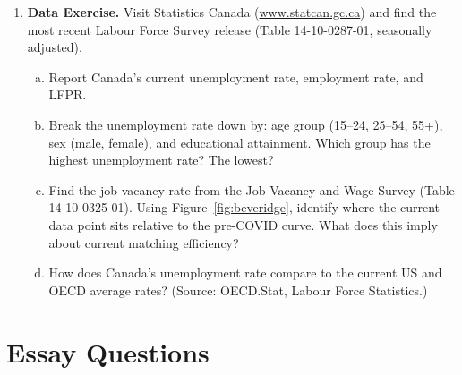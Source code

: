 \begin{enumerate}
\item \textbf{Data Exercise.}
Visit Statistics Canada (\url{www.statcan.gc.ca}) and find the most recent
Labour Force Survey release (Table 14-10-0287-01, seasonally adjusted).
\begin{enumerate}[(a)]
  \item Report Canada's current unemployment rate, employment rate, and LFPR.
  \item Break the unemployment rate down by: age group (15--24, 25--54,
        55+), sex (male, female), and educational attainment.
        Which group has the highest unemployment rate? The lowest?
  \item Find the job vacancy rate from the Job Vacancy and Wage Survey
        (Table 14-10-0325-01). Using Figure~\ref{fig:beveridge}, identify
        where the current data point sits relative to the pre-COVID curve.
        What does this imply about current matching efficiency?
  \item How does Canada's unemployment rate compare to the current US and
        OECD average rates? (Source: OECD.Stat, Labour Force Statistics.)
\end{enumerate}

\end{enumerate}

\section*{Essay Questions}

